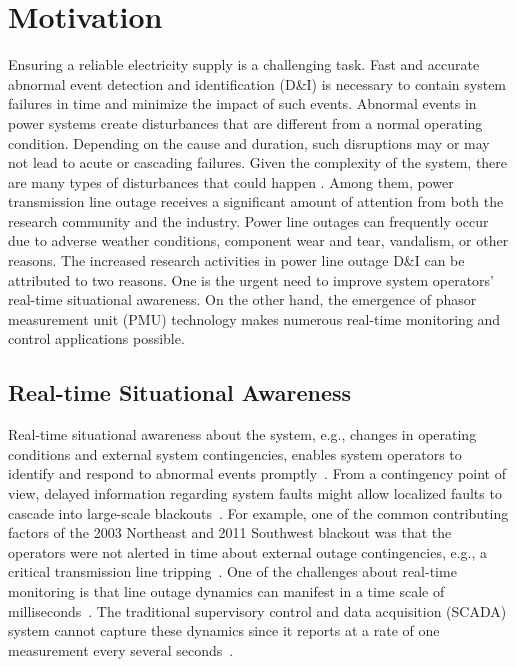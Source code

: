 \section{Motivation}


Ensuring a reliable electricity supply is a challenging task.  Fast and accurate abnormal event detection and identification (D\&I) is necessary to contain system failures in time and minimize the impact of such events. Abnormal events in power systems create disturbances that are different from a normal operating condition. Depending on the cause and duration, such disruptions may or may not lead to acute or cascading failures. Given the complexity of the system, there are many types of disturbances that could happen \cite{seymour2005seven}. Among them, power transmission line outage receives a significant amount of attention from both the research community and the industry. Power line outages can frequently occur due to adverse weather conditions, component wear and tear, vandalism, or other reasons. The increased research activities in power line outage D\&I can be attributed to two reasons. One is the urgent need to improve system operators’ real-time situational awareness. On the other hand, the emergence of phasor measurement unit (PMU) technology makes numerous real-time monitoring and control applications possible.

\subsection{Real-time Situational Awareness}

Real-time situational awareness about the system, e.g., changes in operating conditions and external system contingencies, enables system operators to identify and respond to abnormal events promptly~\cite{kezunovic2013role}. From a contingency point of view, delayed information regarding system faults might allow localized faults to cascade into large-scale blackouts~\cite{Aminifar2014}. For example, one of the common contributing factors of the 2003 Northeast and 2011 Southwest blackout was that the operators were not alerted in time about external outage contingencies, e.g., a critical transmission line tripping~\cite{Johnson2000}. One of the challenges about real-time monitoring is that line outage dynamics can manifest in a time scale of milliseconds~\cite{Milano2010power}. The traditional supervisory control and data acquisition (SCADA) system cannot capture these dynamics since it reports at a rate of one measurement every several seconds~\cite{pignati2015real}.


